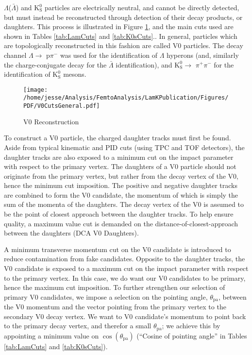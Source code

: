 \documentclass[ALICE,manyauthors]{cernphprep}
\newcommand{\Lam}{$\Lambda$\xspace}
\newcommand{\ALam}{$\bar{\Lambda}$\xspace}
\newcommand{\LamALam}{$\Lambda$($\bar{\Lambda}$)\xspace}
\newcommand{\Ks}{$\mathrm{K^{0}_{S}}$\xspace}
\begin{document}
\LamALam and \Ks particles are electrically neutral, and cannot be directly detected, but must instead be reconstructed through detection of their decay products, or daughters.  
This process is illustrated in Figure \ref{fig:V0Reconstruction}, and the main cuts used are shown in Tables \ref{tab:LamCuts} and \ref{tab:K0sCuts}..
In general, particles which are topologically reconstructed in this fashion are called V0 particles.
The decay channel \Lam $\rightarrow$ p$\pi^{-}$ was used for the identification of \Lam hyperons (and, similarly the charge-conjugate decay for the \ALam identification), and \Ks $\rightarrow$ $\pi^{+}\pi^{-}$ for the identification of \Ks mesons.

\begin{figure}[h]
  \centering
  \texttt{[image: /home/jesse/Analysis/FemtoAnalysis/LamKPublication/Figures/PDF/V0CutsGeneral.pdf]}
  \caption[V0 Reconstruction]{V0 Reconstruction}
  \label{fig:V0Reconstruction}
\end{figure}

To construct a V0 particle, the charged daughter tracks must first be found.  
Aside from typical kinematic and PID cuts (using TPC and TOF detectors), the daughter tracks are also exposed to a minimum cut on the impact parameter with respect to the primary vertex.  
The daughters of a V0 particle should not originate from the primary vertex, but rather from the decay vertex of the V0, hence the minimum cut imposition.  The positive and negative daughter tracks are combined to form the V0 candidate, the momentum of which is simply the sum of the momenta of the daughters.
The decay vertex of the V0 is assumed to be the point of closest approach between the daughter tracks.
To help ensure quality, a maximum value cut is demanded on the distance-of-closest-approach between the daughters (DCA V0 Daughters).

A minimum transverse momentum cut on the V0 candidate is introduced to reduce contamination from fake candidates.
Opposite to the daughter tracks, the V0 candidate is exposed to a maximum cut on the impact parameter with respect to the primary vertex.
In this case, we do want our V0 candidates to be primary, hence the maximum cut imposition.
To further strengthen our selection of primary V0 candidates, we impose a selection on the pointing angle, $\theta_{\mathrm{pa}}$, between the V0 momentum and the vector pointing from the primary vertex to the secondary V0 decay vertex.
We want to V0 candidate's momentum to point back to the primary decay vertex, and therefor a small $\theta_{\mathrm{pa}}$; we achieve this by appointing a minimum value on $\cos(\theta_{\mathrm{pa}})$ (``Cosine of pointing angle'' in Tables \ref{tab:LamCuts} and \ref{tab:K0sCuts}).
\end{document}
